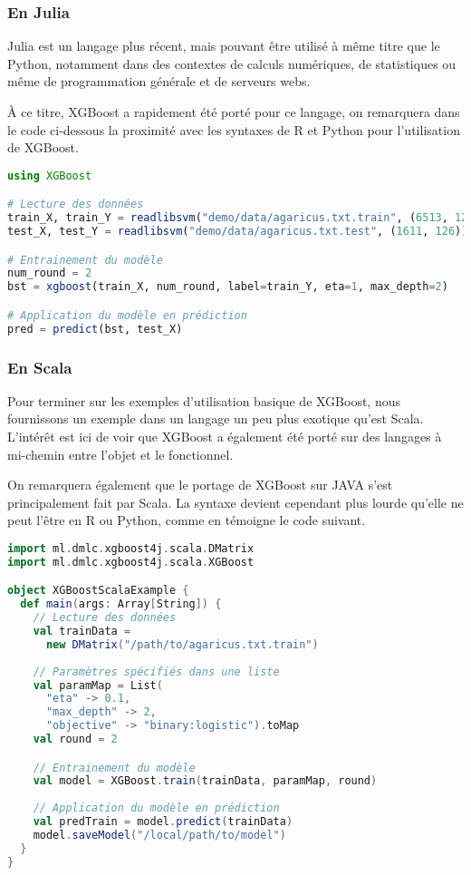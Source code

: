 \subsubsection{En Julia}
Julia est un langage plus récent, mais pouvant être utilisé à même titre que le Python, notamment dans des contextes de calculs numériques, de statistiques ou même de programmation générale et de serveurs webs. 

À ce titre, XGBoost a rapidement été porté pour ce langage, on remarquera dans le code ci-dessous la proximité avec les syntaxes de R et Python pour l'utilisation de XGBoost.
\begin{lstlisting}[language=julia]
using XGBoost

# Lecture des données
train_X, train_Y = readlibsvm("demo/data/agaricus.txt.train", (6513, 126))
test_X, test_Y = readlibsvm("demo/data/agaricus.txt.test", (1611, 126))

# Entrainement du modèle
num_round = 2
bst = xgboost(train_X, num_round, label=train_Y, eta=1, max_depth=2)

# Application du modèle en prédiction
pred = predict(bst, test_X)
\end{lstlisting}

\subsubsection{En Scala}
Pour terminer sur les exemples d'utilisation basique de XGBoost, nous fournissons un exemple dans un langage un peu plus exotique qu'est Scala. L'intérêt est ici de voir que XGBoost a également été porté sur des langages à mi-chemin entre l'objet et le fonctionnel.

On remarquera également que le portage de XGBoost sur JAVA s'est principalement fait par Scala. La syntaxe devient cependant plus lourde qu'elle ne peut l'être en R ou Python, comme en témoigne le code suivant.
\begin{lstlisting}[language=Scala]
import ml.dmlc.xgboost4j.scala.DMatrix
import ml.dmlc.xgboost4j.scala.XGBoost

object XGBoostScalaExample {
  def main(args: Array[String]) {
    // Lecture des données
    val trainData =
      new DMatrix("/path/to/agaricus.txt.train")
    
    // Paramètres spécifiés dans une liste
    val paramMap = List(
      "eta" -> 0.1,
      "max_depth" -> 2,
      "objective" -> "binary:logistic").toMap
    val round = 2

    // Entrainement du modèle
    val model = XGBoost.train(trainData, paramMap, round)
    
    // Application du modèle en prédiction
    val predTrain = model.predict(trainData)
    model.saveModel("/local/path/to/model")
  }
}
\end{lstlisting}

